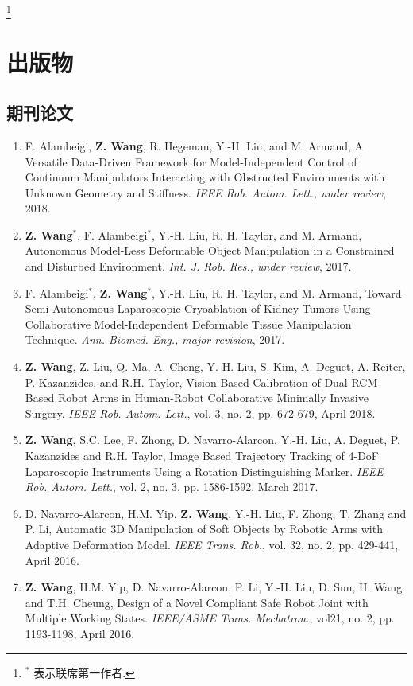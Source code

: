 \documentclass[10pt,letterpaper]{article}
\begin{document}
\let\thefootnote\relax\footnote{$^*$ 表示联席第一作者.}

\section*{出版物}

\subsection*{期刊论文}
\begin{enumerate}
    \item F. Alambeigi, \textbf{Z. Wang}, R. Hegeman, Y.-H. Liu, and M. Armand,
    A Versatile Data-Driven Framework for Model-Independent Control of Continuum Manipulators Interacting with Obstructed Environments with Unknown Geometry and Stiffness.
    \textit{IEEE Rob. Autom. Lett., under review}, 2018.
    \item \textbf{Z. Wang}$^*$, F. Alambeigi$^*$, Y.-H. Liu, R. H. Taylor, and M. Armand,
    Autonomous Model-Less Deformable Object Manipulation in a Constrained and Disturbed Environment.
    \textit{Int. J. Rob. Res., under review}, 2017.
    \item F. Alambeigi$^*$, \textbf{Z. Wang}$^*$, Y.-H. Liu, R. H. Taylor, and M. Armand,
    Toward Semi-Autonomous Laparoscopic Cryoablation of Kidney Tumors Using Collaborative Model-Independent Deformable Tissue Manipulation Technique.
    \textit{Ann. Biomed. Eng., major revision}, 2017.
    \item \textbf{Z. Wang}, Z. Liu, Q. Ma, A. Cheng, Y.-H. Liu, S. Kim, A. Deguet, A. Reiter, P. Kazanzides, and R.H. Taylor,
    Vision-Based Calibration of Dual RCM-Based Robot Arms in Human-Robot Collaborative Minimally Invasive Surgery.
    \textit{IEEE Rob. Autom. Lett.}, vol. 3, no. 2, pp. 672-679, April 2018.
    \item \textbf{Z. Wang}, S.C. Lee, F. Zhong, D. Navarro-Alarcon, Y.-H. Liu, A. Deguet, P. Kazanzides and R.H. Taylor,
    Image Based Trajectory Tracking of 4-DoF Laparoscopic Instruments Using a Rotation Distinguishing Marker.
    \textit{IEEE Rob. Autom. Lett.}, vol. 2, no. 3, pp. 1586-1592, March 2017.
    \item D. Navarro-Alarcon, H.M. Yip, \textbf{Z. Wang}, Y.-H. Liu, F. Zhong, T. Zhang and P. Li,
    Automatic 3D Manipulation of Soft Objects by Robotic Arms with Adaptive Deformation Model.
    \textit{{IEEE} Trans. Rob.}, vol. 32, no. 2, pp. 429-441, April 2016.
    \item \textbf{Z. Wang}, H.M. Yip, D. Navarro-Alarcon, P. Li, Y.-H. Liu, D. Sun, H. Wang and T.H. Cheung,
    Design of a Novel Compliant Safe Robot Joint with Multiple Working States.
    \textit{{IEEE/ASME} Trans. Mechatron.}, vol21, no. 2, pp. 1193-1198, April 2016.
\end{enumerate}
\end{document}
